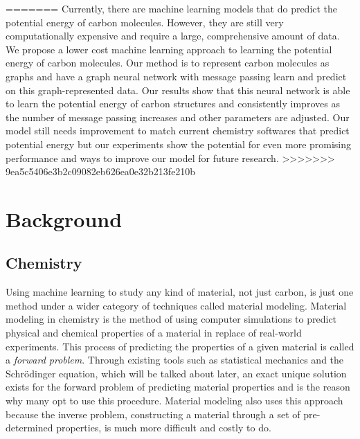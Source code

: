 \documentclass[12pt, abstract = true]{scrartcl}
\begin{document}
=======
Currently, there are machine learning models that do predict the potential energy of carbon molecules. However, they are still very computationally expensive and require a large, comprehensive amount of data. We propose a lower cost machine learning approach to learning the potential energy of carbon molecules. Our method is to represent carbon molecules as graphs and have a graph neural network with message passing learn and predict on this graph-represented data. Our results show that this neural network is able to learn the potential energy of carbon structures and consistently improves as the number of message passing increases and other parameters are adjusted. Our model still needs improvement to match current chemistry softwares that predict potential energy but our experiments show the potential for even more promising performance and ways to improve our model for future research.
>>>>>>> 9ea5c5406e3b2c09082eb626ea0e32b213fe210b
\newpage

\section{Background}

\subsection{Chemistry}

Using machine learning to study any kind of material, not just carbon, 
is just one method under a wider category of techniques called material modeling. 
Material modeling in chemistry is the method of using computer simulations to predict 
physical and chemical properties of a material in replace of real-world experiments. 
This process of predicting the properties of a given material is called a \emph{forward 
problem}. Through existing tools such as statistical mechanics and the Schrödinger 
equation, which will be talked about later, an exact unique solution exists for the 
forward problem of predicting material properties and is the reason why many opt to 
use this procedure. Material modeling also uses this approach because the inverse 
problem, constructing a material through a set of pre-determined properties, 
is much more difficult and costly to do.
\end{document}
